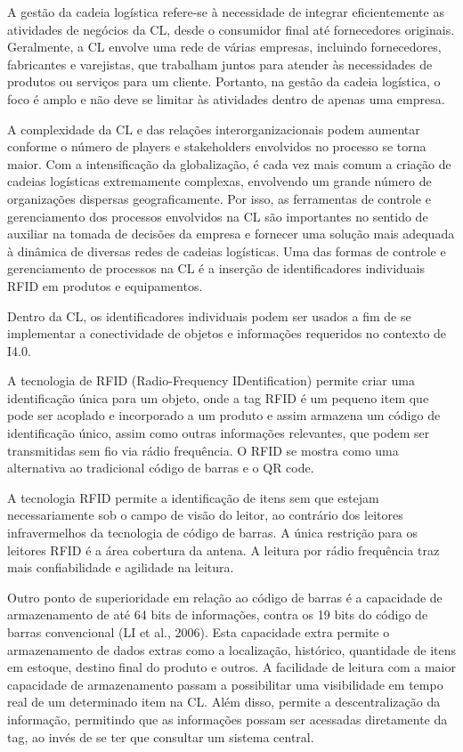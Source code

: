 \documentclass[
	12pt,				%
	oneside,			%
	a4paper,			%
	english,			%
	brazil				%
]{abntex2}
\begin{document}
	A gestão da cadeia logística refere-se à necessidade de integrar eficientemente as atividades de negócios da CL, desde o consumidor final até fornecedores originais. Geralmente, a CL envolve uma rede de várias empresas, incluindo fornecedores, fabricantes e varejistas, que trabalham juntos para atender às necessidades de produtos ou serviços para um cliente. Portanto, na gestão da cadeia logística, o foco é amplo e não deve se limitar às atividades dentro de apenas uma empresa. 

	A complexidade da CL e das relações interorganizacionais podem aumentar conforme o número de players e stakeholders envolvidos no processo se torna maior. Com a intensificação da globalização, é cada vez mais comum a criação de cadeias logísticas extremamente complexas, envolvendo um grande número de organizações dispersas geograficamente. Por isso, as ferramentas de controle e gerenciamento dos processos envolvidos na CL são importantes no sentido de auxiliar na tomada de decisões da empresa e fornecer uma solução mais adequada à dinâmica de diversas redes de cadeias logísticas. Uma das formas de controle e gerenciamento de processos na CL é a inserção de identificadores individuais RFID em produtos e equipamentos.

	Dentro da CL, os identificadores individuais podem ser usados a fim de se implementar a conectividade de objetos e informações requeridos no contexto de I4.0. 

	A tecnologia de RFID (Radio-Frequency IDentification) permite criar uma identificação única para um objeto, onde a tag RFID é um pequeno item que pode ser acoplado e incorporado a um produto e assim armazena um código de identificação único, assim como outras informações relevantes, que podem ser transmitidas sem fio via rádio frequência. O RFID se mostra como uma alternativa ao tradicional código de barras e o QR code.

	A tecnologia RFID permite a identificação de itens sem que estejam necessariamente sob o campo de visão do leitor, ao contrário dos leitores infravermelhos da tecnologia de código de barras. A única restrição para os leitores RFID é a área cobertura da antena. A leitura por rádio frequência traz mais confiabilidade e agilidade na leitura. 

	Outro ponto de superioridade em relação ao código de barras é a capacidade de armazenamento de até 64 bits de informações, contra os 19 bits do código de barras convencional (LI et al., 2006). Esta capacidade extra permite o armazenamento de dados extras como a localização, histórico, quantidade de itens em estoque, destino final do produto e outros. A facilidade de leitura com a maior capacidade de armazenamento passam a possibilitar uma visibilidade em tempo real de um determinado item na CL. Além disso, permite a descentralização da informação, permitindo que as informações possam ser acessadas diretamente da tag, ao invés de se ter que consultar um sistema central.
\end{document}
